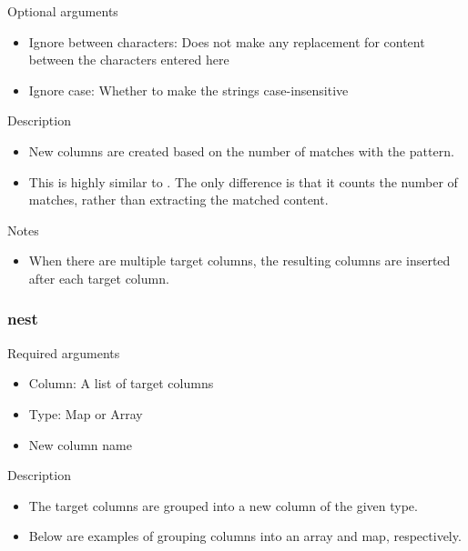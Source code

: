 \documentclass[letterpaper,10pt,english]{sphinxmanual}
\begin{document}
Optional arguments
\begin{itemize}
\item {} 
Ignore between characters: Does not make any replacement for content between the characters entered here

\item {} 
Ignore case: Whether to make the strings case-insensitive

\end{itemize}

Description
\begin{itemize}
\item {} 
New columns are created based on the number of matches with the pattern.

\item {} 
This is highly similar to {\hyperref[\detokenize{discovery/part07/rule_kinds:extract}]{}}. The only difference is that it counts the number of matches, rather than extracting the matched content.

\end{itemize}

Notes
\begin{itemize}
\item {} 
When there are multiple target columns, the resulting columns are inserted after each target column.

\end{itemize}


\subsubsection{nest}
\label{\detokenize{discovery/part07/rule_kinds:nest}}
Required arguments
\begin{itemize}
\item {} 
Column: A list of target columns

\item {} 
Type: Map or Array

\item {} 
New column name

\end{itemize}

Description
\begin{itemize}
\item {} 
The target columns are grouped into a new column of the given type.

\item {} 
Below are examples of grouping columns into an array and map, respectively.
\begin{quote}

\begin{figure}[H]
\centering

\noindent{}
\end{figure}
\end{quote}

\end{itemize}
\end{document}
